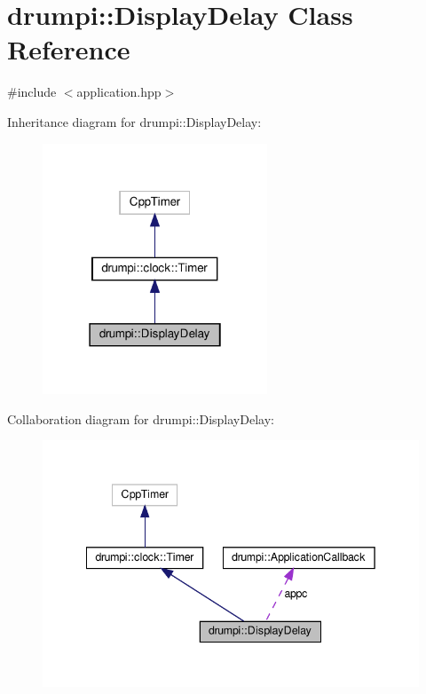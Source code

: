 \hypertarget{classdrumpi_1_1DisplayDelay}{}\section{drumpi\+:\+:Display\+Delay Class Reference}
\label{classdrumpi_1_1DisplayDelay}


{\ttfamily \#include $<$application.\+hpp$>$}



Inheritance diagram for drumpi\+:\+:Display\+Delay\+:
\nopagebreak
\begin{figure}[H]
\begin{center}
\leavevmode
\includegraphics[width=190pt]{classdrumpi_1_1DisplayDelay__inherit__graph}
\end{center}
\end{figure}


Collaboration diagram for drumpi\+:\+:Display\+Delay\+:
\nopagebreak
\begin{figure}[H]
\begin{center}
\leavevmode
\includegraphics[width=342pt]{classdrumpi_1_1DisplayDelay__coll__graph}
\end{center}
\end{figure}
